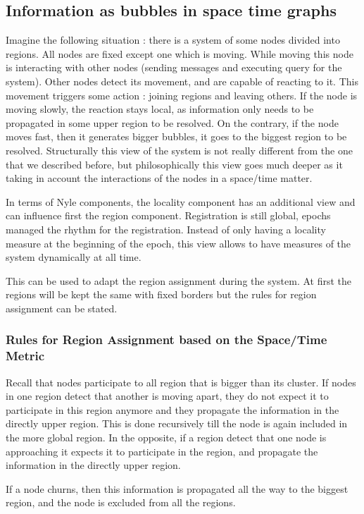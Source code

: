 \documentclass[a4paper,11pt,oneside]{report}
\begin{document}
\subsection{Information as bubbles in space time graphs}

Imagine the following situation : there is a system of some nodes divided into
regions. All nodes are fixed except one which is moving. While moving this node
is interacting with other nodes (sending messages and executing query for the
system). Other nodes detect its movement, and are capable of reacting to it.
This movement triggers some action : joining regions and leaving others. If the
node is moving slowly, the reaction stays local, as information only needs to
be propagated in some upper region to be resolved. On the contrary, if the node
moves fast, then it generates bigger bubbles, it goes to the biggest region to
be resolved.  Structurally this view of the system is not really different from
the one that we described before, but philosophically this view goes much
deeper as it taking in account the interactions of the nodes in a space/time
matter.

In terms of Nyle components, the locality component has an additional view and
can influence first the region component. Registration is still global, epochs
managed the rhythm for the registration. Instead of only having a locality
measure at the beginning of the epoch, this view allows to have measures of the
system dynamically at all time. 

This can be used to adapt the region assignment during the system. At first the
regions will be kept the same with fixed borders but the rules for region
assignment can be stated. 

\subsubsection{Rules for Region Assignment based on the Space/Time Metric}
Recall that nodes participate to all region that is bigger than its cluster. If
nodes in one region detect that another is moving apart, they do not expect it
to participate in this region anymore and they propagate the information in the
directly upper region. This is done recursively till the node is again included
in the more global region.  In the opposite, if a region detect that one node
is approaching it expects it to participate in the region, and propagate the
information in the directly upper region.

If a node churns, then this information is propagated all the way to the
biggest region, and the node is excluded from all the regions. 
\end{document}
